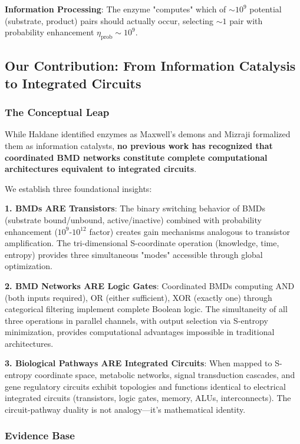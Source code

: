 \documentclass[11pt,a4paper]{article}
\begin{document}
\textbf{Information Processing}: The enzyme "computes" which of $\sim 10^9$ potential (substrate, product) pairs should actually occur, selecting $\sim 1$ pair with probability enhancement $\eta_{\text{prob}} \sim 10^9$.

\subsection{Our Contribution: From Information Catalysis to Integrated Circuits}

\subsubsection{The Conceptual Leap}

While Haldane identified enzymes as Maxwell's demons and Mizraji formalized them as information catalysts, \textbf{no previous work has recognized that coordinated BMD networks constitute complete computational architectures equivalent to integrated circuits}.

We establish three foundational insights:

\textbf{1. BMDs ARE Transistors}: The binary switching behavior of BMDs (substrate bound/unbound, active/inactive) combined with probability enhancement ($10^9$-$10^{12}$ factor) creates gain mechanisms analogous to transistor amplification. The tri-dimensional S-coordinate operation (knowledge, time, entropy) provides three simultaneous "modes" accessible through global optimization.

\textbf{2. BMD Networks ARE Logic Gates}: Coordinated BMDs computing AND (both inputs required), OR (either sufficient), XOR (exactly one) through categorical filtering implement complete Boolean logic. The simultaneity of all three operations in parallel channels, with output selection via S-entropy minimization, provides computational advantages impossible in traditional architectures.

\textbf{3. Biological Pathways ARE Integrated Circuits}: When mapped to S-entropy coordinate space, metabolic networks, signal transduction cascades, and gene regulatory circuits exhibit topologies and functions identical to electrical integrated circuits (transistors, logic gates, memory, ALUs, interconnects). The circuit-pathway duality is not analogy—it's mathematical identity.

\subsubsection{Evidence Base}
\end{document}
